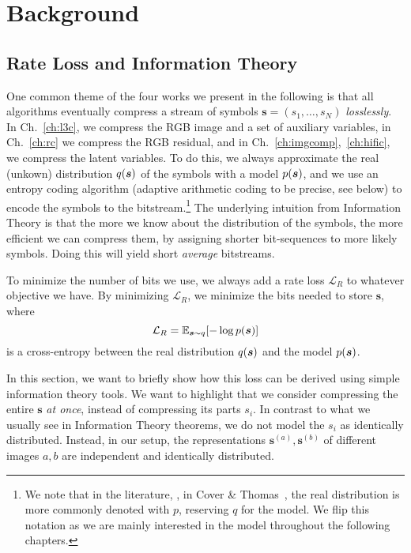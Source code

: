 \chapter{Background} \label{ch:bac}

\section{Rate Loss and Information Theory}

One common theme of the four works we present in the following is that all
algorithms eventually compress a stream of symbols $\bm s=(s_1, \dots, s_N)$
\emph{losslessly}. In Ch.~\ref{ch:l3c}, we compress the RGB image and a set of
auxiliary variables, in Ch.~\ref{ch:rc} we compress the RGB residual, and in
Ch.~\ref{ch:imgcomp},~\ref{ch:hific}, we compress the latent variables.  To do
this, we always approximate the real (unkown) distribution $q(\bm s)$
of the symbols with a model $p(\bm s)$, and we use an entropy coding
algorithm (adaptive arithmetic coding to be precise, see below) to encode the
symbols to the bitstream.\footnote{We note that in the literature,
\eg, in Cover \& Thomas~\cite{cover2012elements}, the real distribution is more
commonly denoted with $p$, reserving $q$ for the model. We flip this notation as we are
mainly interested in the model throughout the following chapters.} The underlying
intuition from Information Theory is that the more we know about the
distribution of the symbols, the more efficient we can compress them, by
assigning shorter bit-sequences to more likely symbols. Doing this will yield
short \emph{average} bitstreams.

To minimize the number of bits we use, we always add a rate loss
$\mathcal{L}_R$ to whatever objective we have. By minimizing $\mathcal{L}_R$, we minimize the bits needed to store $\bm s$, where
\begin{equation} 
    \mathcal{L}_R = \mathbb{E}_{\bm s \sim q}[-\log p(\bm s)]\label{bac:eq:loss}
\end{equation}
is a cross-entropy between the real distribution $q(\bm s)$ and the model $p(\bm s)$. 

In this section, we want to briefly show how this loss can be derived using
simple information theory tools. We want to highlight that we consider
compressing the entire $\bm s$ \emph{at once}, instead of compressing its parts
$s_i$. In contrast to what we usually see in Information Theory theorems, we do
not model the $s_i$ as identically distributed. Instead, in our setup, the
representations $\bm s^{(a)}, \bm s^{(b)}$ of different images $a, b$ are
independent and identically distributed.

